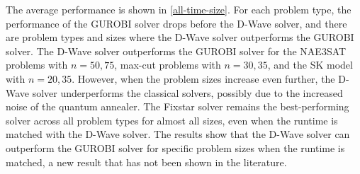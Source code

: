 \begin{table}[!htb]
    \centering
    \caption{Average runtime (seconds) of the D-Wave solver by problem type and size. Dashes indicate that the D-Wave solver could not embed problems of that size.}
    \label{results:averageruntimedwave}
\end{table}

The average performance is shown in \autoref{all-time-size}. For each problem type, the performance of the GUROBI solver drops before the D-Wave solver, and there are problem types and sizes where the D-Wave solver outperforms the GUROBI solver. The D-Wave solver outperforms the GUROBI solver for the NAE3SAT problems with $n=50, 75$, max-cut problems with $n=30, 35$, and the SK model with $n=20, 35$. However, when the problem sizes increase even further, the D-Wave solver underperforms the classical solvers, possibly due to the increased noise of the quantum annealer. The Fixstar solver remains the best-performing solver across all problem types for almost all sizes, even when the runtime is matched with the D-Wave solver. The results show that the D-Wave solver can outperform the GUROBI solver for specific problem sizes when the runtime is matched, a new result that has not been shown in the literature. 

